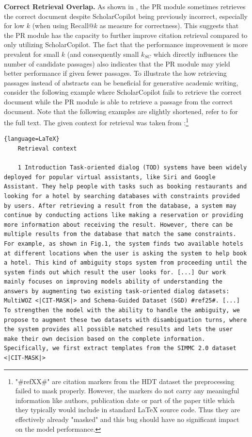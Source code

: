 \textbf{Correct Retrieval Overlap.} As shown in , the PR module sometimes retrieves the correct document despite ScholarCopilot being previously incorrect, especially for low $k$ (when using Recall@$k$ as measure for correctness). This suggests that the PR module has the capacity to further improve citation retrieval compared to only utilizing ScholarCopilot. The fact that the performance improvement is more prevalent for small $k$ (and consequently small $k_{SC}$ which directly influences the number of candidate passages) also indicates that the PR module may yield better performance if given fewer passages. To illustrate the how retrieving passages instead of abstracts can be beneficial for generative academic writing, consider the following example where ScholarCopilot fails to retrieve the correct document while the PR module is able to retrieve a passage from the correct document. Note that the following examples are slightly shortened, refer to  for the full text. The given context for retrieval was taken from \cite{qian2021database}:\footnote{"\#refXX\#" are citation markers from the HDT dataset the preprocessing failed to mask properly. However, the markers do not carry any meaningful information like authors, publication date or part of the paper title which they typically would include in standard LaTeX source code. Thus they are effectively already "masked" and this bug should have no significant impact on the model performance.}
\begin{lstlisting}{language=LaTeX}
    Retrieval context

    1 Introduction Task-oriented dialog (TOD) systems have been widely deployed for popular virtual assistants, like Siri and Google Assistant. They help people with tasks such as booking restaurants and looking for a hotel by searching databases with constraints provided by users. After retrieving a result from the database, a system may continue by conducting actions like making a reservation or providing more information about receiving the result. However, there can be multiple results from the database that match the same constraints. For example, as shown in Fig.1, the system finds two available hotels at different locations when the user is asking the system to help book a hotel. This kind of ambiguity stops system from proceeding until the system finds out which result the user looks for. [...] Our work mainly focuses on improving models ability of understanding the answers by augmenting two existing task-oriented dialog datasets: MultiWOZ <|CIT-MASK|> and Schema-Guided Dataset (SGD) #ref25#. [...] To strengthen the model with the ability to handle the ambiguity, we propose to augment these two datasets with disambiguation turns, where the system provides all possible matched results and lets the user make their own decision based on the complete information. Specifically, we first extract templates from the SIMMC 2.0 dataset <|CIT-MASK|>
\end{lstlisting}
